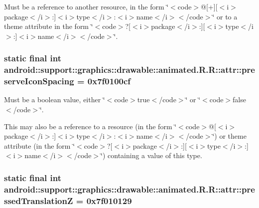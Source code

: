 Must be a reference to another resource, in the form \char`\"{}$<$code$>$@\mbox{[}+\mbox{]}\mbox{[}$<$i$>$package$<$/i$>$:\mbox{]}$<$i$>$type$<$/i$>$:$<$i$>$name$<$/i$>$$<$/code$>$\char`\"{} or to a theme attribute in the form \char`\"{}$<$code$>$?\mbox{[}$<$i$>$package$<$/i$>$:\mbox{]}\mbox{[}$<$i$>$type$<$/i$>$:\mbox{]}$<$i$>$name$<$/i$>$$<$/code$>$\char`\"{}. \hypertarget{classandroid_1_1support_1_1graphics_1_1drawable_1_1animated_1_1_r_1_1attr_119ef6c79b4784a26a69b95d11166b5c}{
\subsubsection[{preserveIconSpacing}]{\setlength{\rightskip}{0pt plus 5cm}static final int android::support::graphics::drawable::animated.R.R::attr::preserveIconSpacing = 0x7f0100cf}}
\label{classandroid_1_1support_1_1graphics_1_1drawable_1_1animated_1_1_r_1_1attr_119ef6c79b4784a26a69b95d11166b5c}


Must be a boolean value, either \char`\"{}$<$code$>$true$<$/code$>$\char`\"{} or \char`\"{}$<$code$>$false$<$/code$>$\char`\"{}. 

This may also be a reference to a resource (in the form \char`\"{}$<$code$>$@\mbox{[}$<$i$>$package$<$/i$>$:\mbox{]}$<$i$>$type$<$/i$>$:$<$i$>$name$<$/i$>$$<$/code$>$\char`\"{}) or theme attribute (in the form \char`\"{}$<$code$>$?\mbox{[}$<$i$>$package$<$/i$>$:\mbox{]}\mbox{[}$<$i$>$type$<$/i$>$:\mbox{]}$<$i$>$name$<$/i$>$$<$/code$>$\char`\"{}) containing a value of this type. \hypertarget{classandroid_1_1support_1_1graphics_1_1drawable_1_1animated_1_1_r_1_1attr_12bc1f06a931d28197c75d5419068676}{
\subsubsection[{pressedTranslationZ}]{\setlength{\rightskip}{0pt plus 5cm}static final int android::support::graphics::drawable::animated.R.R::attr::pressedTranslationZ = 0x7f010129}}
\label{classandroid_1_1support_1_1graphics_1_1drawable_1_1animated_1_1_r_1_1attr_12bc1f06a931d28197c75d5419068676}


